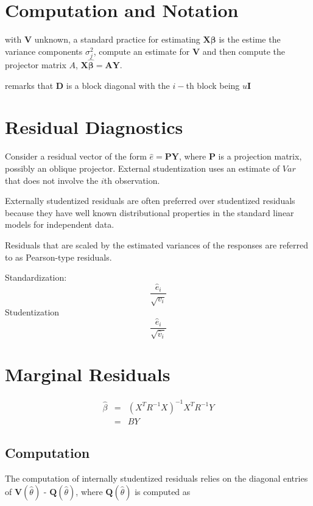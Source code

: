 \documentclass[Main.tex]{subfiles}
\begin{document}
\section{Computation and Notation } %
with $\boldsymbol{V}$ unknown, a standard practice for estimating $\boldsymbol{X \beta}$ is the estime the variance components $\sigma^2_j$,
compute an estimate for $\boldsymbol{V}$ and then compute the projector matrix $A$, $\boldsymbol{X \hat{\beta}}  = \boldsymbol{AY}$.

\citet{zewotir} remarks that $\boldsymbol{D}$ is a block diagonal with the $i-$th block being $u \boldsymbol{I}$




\section{Residual Diagnostics}

Consider a residual vector of the form $\hat{e} = \boldsymbol{PY} $, where $\boldsymbol{P}$ is a projection matrix, possibly an oblique projector.
External studentization uses an estimate of $Var$ that does not involve the $i$th observation.

Externally studentized residuals are often preferred over studentized residuals because they have well known distributional
properties in the standard linear models for independent data.

Residuals that are scaled by the estimated variances of the responses are referred to as Pearson-type residuals.

Standardization: \[ \frac{\hat{e}_i}{\sqrt{v_i}}\]
Studentization \[ \frac{\hat{e}_i}{\sqrt{\hat{v}_i}}\]



	\section{Marginal Residuals}
	\begin{eqnarray}
	\hat{\beta} &=& (X^{T}R^{-1}X)^{-1}X^{T}R^{-1}Y \nonumber \\
	&=& BY \nonumber
	\end{eqnarray}



\subsection{Computation}%

The computation of internally studentized residuals relies on the diagonal entries of $\boldsymbol{V} (\hat{\theta})$ - $\boldsymbol{Q} (\hat{\theta})$, where $\boldsymbol{Q} (\hat{\theta})$ is computed as
\end{document}
